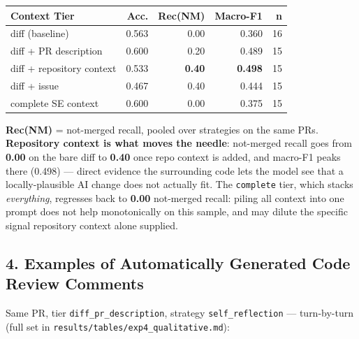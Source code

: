 \documentclass{experimentreport}
\begin{document}
{\begin{center}
\small
\begin{tabular}{|l|r|r|r|r|}
\hline
\textbf{Context Tier} & \textbf{Acc.} & \textbf{Rec(NM)} & \textbf{Macro-F1} & \textbf{n} \\
\hline
diff (baseline)             & 0.563 & 0.00 & 0.360 & 16 \\
diff + PR description       & 0.600 & 0.20 & 0.489 & 15 \\
diff + repository context   & 0.533 & \textbf{0.40} & \textbf{0.498} & 15 \\
diff + issue\footnotemark   & 0.467 & 0.40 & 0.444 & 15 \\
complete SE context         & 0.600 & 0.00 & 0.375 & 15 \\
\hline
\end{tabular}
\end{center}
\noindent\textbf{Rec(NM)} = not-merged recall, pooled over strategies on the same PRs.
\textbf{Repository context is what moves the needle}: not-merged recall goes from \textbf{0.00} on
the bare diff to \textbf{0.40} once repo context is added, and macro-F1 peaks there (0.498) ---
direct evidence the surrounding code lets the model see that a locally-plausible AI change does not
actually fit. The \texttt{complete} tier, which stacks \emph{everything}, regresses back to
\textbf{0.00} not-merged recall: piling all context into one prompt does not help monotonically on
this sample, and may dilute the specific signal repository context alone supplied.

\subsection*{4. Examples of Automatically Generated Code Review Comments}

Same PR, tier \texttt{diff\_pr\_description}, strategy \texttt{self\_reflection} --- turn-by-turn
(full set in \texttt{results/tables/exp4\_qualitative.md}):

}
\end{document}
